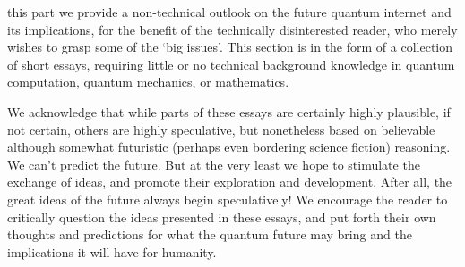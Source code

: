 %
%

\newline

\newline

 this part we provide a non-technical outlook on the future quantum internet and its implications, for the benefit of the technically disinterested reader, who merely wishes to grasp some of the `big issues'. This section is in the form of a collection of short essays, requiring little or no technical background knowledge in quantum computation, quantum mechanics, or mathematics. 

We acknowledge that while parts of these essays are certainly highly plausible, if not certain, others are highly speculative, but nonetheless based on believable although somewhat futuristic (perhaps even bordering science fiction) reasoning. We can't predict the future. But at the very least we hope to stimulate the exchange of ideas, and promote their exploration and development. After all, the great ideas of the future always begin speculatively! We encourage the reader to critically question the ideas presented in these essays, and put forth their own thoughts and predictions for what the quantum future may bring and the implications it will have for humanity.

%
%




%
%





%
%




%
%



